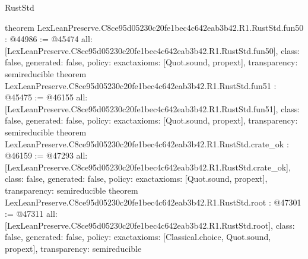 \begin{lexlean}{RustStd}
\begin{coremodule}
{}
theorem LexLeanPreserve.C8ce95d05230c20fe1bec4c642eab3b42.R1.RustStd.fun50 : @44986 := @45474 {
  all: [LexLeanPreserve.C8ce95d05230c20fe1bec4c642eab3b42.R1.RustStd.fun50],
  class: false,
  generated: false,
  policy: exact{axioms: [Quot.sound, propext]},
  transparency: semireducible
}
theorem LexLeanPreserve.C8ce95d05230c20fe1bec4c642eab3b42.R1.RustStd.fun51 : @45475 := @46155 {
  all: [LexLeanPreserve.C8ce95d05230c20fe1bec4c642eab3b42.R1.RustStd.fun51],
  class: false,
  generated: false,
  policy: exact{axioms: [Quot.sound, propext]},
  transparency: semireducible
}
theorem LexLeanPreserve.C8ce95d05230c20fe1bec4c642eab3b42.R1.RustStd.crate_ok : @46159 := @47293 {
  all: [LexLeanPreserve.C8ce95d05230c20fe1bec4c642eab3b42.R1.RustStd.crate_ok],
  class: false,
  generated: false,
  policy: exact{axioms: [Quot.sound, propext]},
  transparency: semireducible
}
theorem LexLeanPreserve.C8ce95d05230c20fe1bec4c642eab3b42.R1.RustStd.root : @47301 := @47311 {
  all: [LexLeanPreserve.C8ce95d05230c20fe1bec4c642eab3b42.R1.RustStd.root],
  class: false,
  generated: false,
  policy: exact{axioms: [Classical.choice, Quot.sound, propext]},
  transparency: semireducible
}


\end{coremodule}
\end{lexlean}
